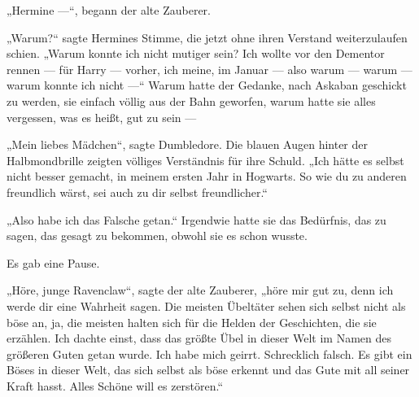„Hermine —“, begann der alte Zauberer.

„Warum?“ sagte Hermines Stimme, die jetzt ohne ihren Verstand weiterzulaufen schien.
„Warum konnte ich nicht mutiger sein? Ich wollte vor den Dementor rennen — für Harry — vorher, ich meine, im Januar — also warum — warum — warum konnte ich nicht —“
Warum hatte der Gedanke, nach Askaban geschickt zu werden, sie einfach völlig aus der Bahn geworfen, warum hatte sie alles vergessen, was es heißt, gut zu sein —

„Mein liebes Mädchen“, sagte Dumbledore. Die blauen Augen hinter der Halbmondbrille zeigten völliges Verständnis für ihre Schuld.
„Ich hätte es selbst nicht besser gemacht, in meinem ersten Jahr in Hogwarts. So wie du zu anderen freundlich wärst, sei auch zu dir selbst freundlicher.“

„Also habe ich das Falsche getan.“
Irgendwie hatte sie das Bedürfnis, das zu sagen, das gesagt zu bekommen, obwohl sie es schon wusste.

Es gab eine Pause.

„Höre, junge Ravenclaw“, sagte der alte Zauberer, „höre mir gut zu, denn ich werde dir eine Wahrheit sagen. Die meisten Übeltäter sehen sich selbst nicht als böse an, ja, die meisten halten sich für die Helden der Geschichten, die sie erzählen. Ich dachte einst, dass das größte Übel in dieser Welt im Namen des größeren Guten getan wurde. Ich habe mich geirrt. Schrecklich falsch. Es gibt ein Böses in dieser Welt, das sich selbst als böse erkennt und das Gute mit all seiner Kraft hasst. Alles Schöne will es zerstören.“

